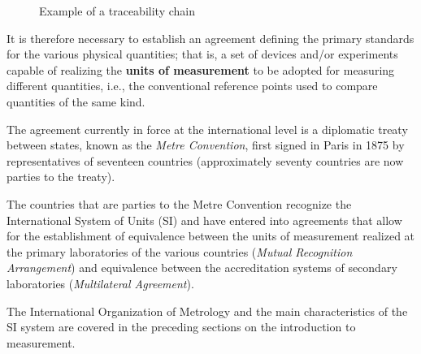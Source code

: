 \documentclass[../main.tex]{subfiles}
\begin{document}
\begin{figure}[h]
\begin{center}
\caption{Example of a traceability chain}
\label{fig:trace}
\end{center}
\end{figure}


It is therefore necessary to establish an agreement defining the primary standards for the various physical quantities; that is, a set of devices and/or experiments capable of realizing the \textbf{units of measurement} to be adopted for measuring different quantities, i.e., the conventional reference points used to compare quantities of the same kind.

The agreement currently in force at the international level is a diplomatic treaty between states, known as the \textit{Metre Convention}, first signed in Paris in 1875 by representatives of seventeen countries (approximately seventy countries are now parties to the treaty). 

The countries that are parties to the Metre Convention recognize the International System of Units (SI) and have entered into agreements that allow for the establishment of equivalence between the units of measurement realized at the primary laboratories of the various countries (\textit{Mutual Recognition Arrangement}) and equivalence between the accreditation systems of secondary laboratories (\textit{Multilateral Agreement}).

The International Organization of Metrology and the main characteristics of the SI system are covered in the preceding sections on the introduction to measurement.
\end{document}

